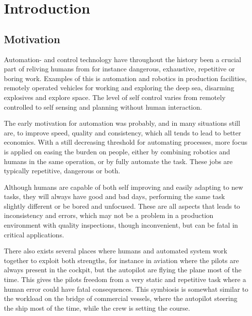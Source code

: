 
\chapter{Introduction}\label{chapter:introduction}
\section{Motivation}\label{sec:motivation}
Automation- and control technology have throughout the history been a crucial part of reliving humans from for instance dangerous, exhaustive, repetitive or boring work. Examples of this is automation and robotics in production facilities, remotely operated vehicles for working and exploring the deep sea, disarming explosives and explore space. The level of self control varies from remotely controlled to self sensing and planning without human interaction.

The early motivation for automation was probably, and in many situations still are, to improve speed, quality and consistency, which all tends to lead to better economics. With a still decreasing threshold for automating processes, more focus is applied on easing the burden on people, either by combining robotics and humans in the same operation, or by fully automate the task. These jobs are typically repetitive, dangerous or both.

Although humans are capable of both self improving and easily adapting to new tasks, they  will always have good and bad days, performing the same task slightly different or be bored and unfocused. These are all aspects that leads to inconsistency and errors, which may not be a problem in a production environment with quality inspections, though inconvenient, but can be fatal in critical applications. 

There also exists several places where humans and automated system work together to exploit both strengths, for instance in aviation where the pilots are always present in the cockpit, but the autopilot are flying the plane most of the time. This gives the pilots freedom from a very static and repetitive task where a human error could have fatal consequences. This symbiosis is somewhat similar to the workload on the bridge of commercial vessels, where the autopilot steering the ship most of the time, while the crew is setting the course. 


